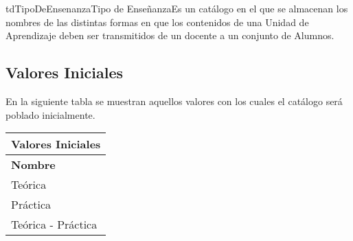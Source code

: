 \begin{TipoDeDato}{tdTipoDeEnsenanza}{Tipo de Enseñanza}{Es un catálogo en el que se almacenan los nombres de las distintas formas en que los contenidos de una Unidad de Aprendizaje deben ser transmitidos de un docente a un conjunto de Alumnos.}

	\begin{tdAtributos}
	\end{tdAtributos}
	
	\subsection{Valores Iniciales}
	En la siguiente tabla se muestran aquellos valores con los cuales el catálogo será poblado inicialmente.\cdtEmpty
		
		\begin{longtable}{| p{}| }
	 			\rowcolor{colorPrincipal}
	 			\bf \color{white} Valores Iniciales\\
	 			\hline
	 			\rowcolor{colorSecundario}
	 			\bf \color{white} Nombre  \\
	 			\hline
	 			Teórica\\
	 			\hline
	 			Práctica\\
	 			\hline
	 			Teórica - Práctica \\
	 			\hline
	 		\end{longtable}
\end{TipoDeDato}

